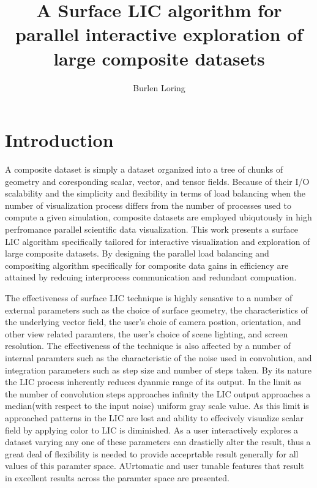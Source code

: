 \documentclass[a4paper,10pt]{article}
\title{A Surface LIC algorithm for parallel interactive exploration of large composite datasets}
\author{Burlen Loring}
\begin{document}
\maketitle

\begin{abstract}

\end{abstract}

\section{Introduction}
A composite dataset is simply a dataset organized into a tree of chunks of geometry and coresponding scalar, vector, and tensor fields. Because of their I/O scalability and the simplicity and flexibility in terms of load balancing when the number of visualization process differs from the number of processes used to compute a given simulation, composite datasets are employed ubiqutously in high perfromance parallel scientific data visualization. This work presents a surface LIC algorithm specifically tailored for interactive visualization and exploration of large composite datasets. By designing the parallel load balancing and compositing algorithm specifically for composite data gains in efficiency are attained by redcuing interprocess communication and redundant compuation. 

The effectiveness of surface LIC technique is highly sensative to a number of external parameters such as the choice of surface geometry, the characteristics of the underlying vector field, the user's choie of camera postion, orientation, and other view related paramters, the user's choice of scene lighting, and screen resolution. The effectiveness of the technique is also affected by a number of internal paramters such as the characteristic of the noise used in convolution, and integration parameters such as step size and number of steps taken. By its nature the LIC process inherently reduces dyanmic range of its output. In the limit as the number of convolution steps approaches infinity the LIC output approaches a median(with respect to the input noise) uniform gray scale value. As this limit is approached patterns in the LIC are lost and ability to effecively visualize scalar field by applying color to LIC is diminished. As a user interactively explores a dataset varying any one of these parameters can drasticlly alter the result, thus a great deal of flexibility is needed to provide acceprtable result generally for all values of this paramter space. AUrtomatic and user tunable features that result in excellent results across the paramter space are presented. 
\end{document}
